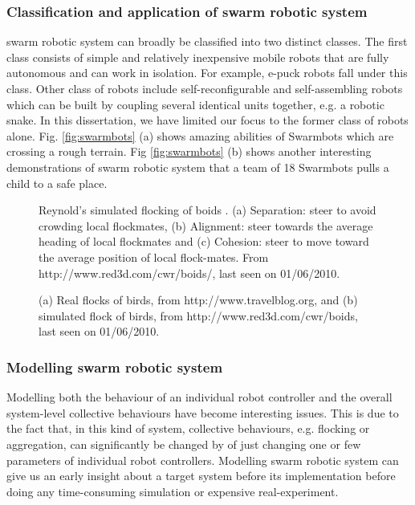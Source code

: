 \subsubsection*{Classification and application of swarm robotic system}
swarm robotic system can broadly be classified into two distinct classes. The first class consists of simple and relatively inexpensive mobile robots that are fully autonomous and can work in isolation. For example, e-puck robots \cite{Cianci+2004} fall under this class. Other class of robots include self-reconfigurable \cite{Fukuda+1987} and self-assembling robots which can be built by coupling several identical units together, e.g. a robotic snake. In this dissertation, we have limited our focus to the former class of robots alone. Fig. \ref{fig:swarmbots} (a) shows amazing abilities of Swarmbots which are crossing a rough terrain. Fig \ref{fig:swarmbots} (b) shows another interesting demonstrations of swarm robotic system that a team of 18 Swarmbots pulls a child to a safe place.
\begin{figure}
\centering
{} 
\hspace{0.25cm}
\hspace{0.25cm}
\caption{ Reynold's simulated flocking of boids \protect{}. (a) Separation: steer to avoid crowding local flockmates, (b) Alignment: steer towards the average heading of local flockmates and (c) Cohesion: steer to move toward the average position of local flock-mates. \protect\newline  From http://www.red3d.com/cwr/boids/, last seen on 01/06/2010.}
\label{fig:boid-rules}
\end{figure}
\begin{figure}
\centering
{} 
\hspace{0.25cm}
\caption{ (a) Real flocks of birds, from http://www.travelblog.org, and (b) simulated flock of birds, from http://www.red3d.com/cwr/boids, last seen on 01/06/2010.}
\label{fig:flocking-birds}
\end{figure}
\subsubsection*{Modelling swarm robotic system}
Modelling both the behaviour of an individual robot controller and the overall system-level collective behaviours have become interesting issues. This is due to the fact that, in this kind of system, collective behaviours, e.g. flocking or aggregation, can significantly be changed by of just changing one or few parameters of individual robot controllers. Modelling swarm robotic system can give us an early insight about a target system before its implementation before doing any time-consuming simulation or expensive real-experiment.


